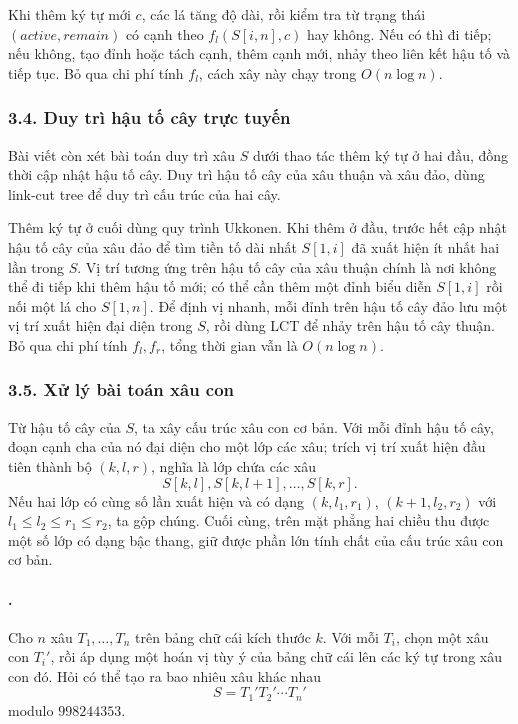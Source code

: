 \documentclass[11pt]{article}
\begin{document}
Khi thêm ký tự mới \(c\), các lá tăng độ dài, rồi kiểm tra từ trạng thái
\((active,remain)\) có cạnh theo \(f_l(S[i,n],c)\) hay không. Nếu có thì đi
tiếp; nếu không, tạo đỉnh hoặc tách cạnh, thêm cạnh mới, nhảy theo liên kết
hậu tố và tiếp tục. Bỏ qua chi phí tính \(f_l\), cách xây này chạy trong
\(O(n\log n)\).

\subsubsection*{3.4. Duy trì hậu tố cây trực tuyến}

Bài viết còn xét bài toán duy trì xâu \(S\) dưới thao tác thêm ký tự ở hai đầu,
đồng thời cập nhật hậu tố cây. Duy trì hậu tố cây của xâu thuận và xâu đảo,
dùng link-cut tree để duy trì cấu trúc của hai cây.

Thêm ký tự ở cuối dùng quy trình Ukkonen. Khi thêm ở đầu, trước hết cập nhật
hậu tố cây của xâu đảo để tìm tiền tố dài nhất \(S[1,i]\) đã xuất hiện ít nhất
hai lần trong \(S\). Vị trí tương ứng trên hậu tố cây của xâu thuận chính là
nơi không thể đi tiếp khi thêm hậu tố mới; có thể cần thêm một đỉnh biểu diễn
\(S[1,i]\) rồi nối một lá cho \(S[1,n]\). Để định vị nhanh, mỗi đỉnh trên hậu
tố cây đảo lưu một vị trí xuất hiện đại diện trong \(S\), rồi dùng LCT để nhảy
trên hậu tố cây thuận. Bỏ qua chi phí tính \(f_l,f_r\), tổng thời gian vẫn là
\(O(n\log n)\).

\subsubsection*{3.5. Xử lý bài toán xâu con}

Từ hậu tố cây của \(S\), ta xây cấu trúc xâu con cơ bản. Với mỗi đỉnh hậu tố
cây, đoạn cạnh cha của nó đại diện cho một lớp các xâu; trích vị trí xuất hiện
đầu tiên thành bộ \((k,l,r)\), nghĩa là lớp chứa các xâu
\[
  S[k,l],S[k,l+1],\ldots,S[k,r].
\]
Nếu hai lớp có cùng số lần xuất hiện và có dạng \((k,l_1,r_1)\),
\((k+1,l_2,r_2)\) với \(l_1\le l_2\le r_1\le r_2\), ta gộp chúng. Cuối cùng,
trên mặt phẳng hai chiều thu được một số lớp có dạng bậc thang, giữ được phần
lớn tính chất của cấu trúc xâu con cơ bản.

\paragraph{.}
Cho \(n\) xâu \(T_1,\ldots,T_n\) trên bảng chữ cái kích thước \(k\). Với mỗi
\(T_i\), chọn một xâu con \(T_i'\), rồi áp dụng một hoán vị tùy ý của bảng chữ
cái lên các ký tự trong xâu con đó. Hỏi có thể tạo ra bao nhiêu xâu khác nhau
\[
  S=T_1'T_2'\cdots T_n'
\]
modulo \(998244353\).
\end{document}
